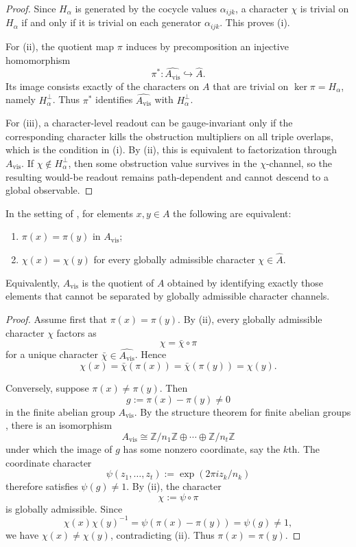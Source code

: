 \begin{proof}
Since $H_\alpha$ is generated by the cocycle values $\alpha_{ijk}$, a character $\chi$ is trivial on $H_\alpha$ if and only if it is trivial on each generator $\alpha_{ijk}$. This proves (i).

For (ii), the quotient map $\pi$ induces by precomposition an injective homomorphism
\[
\pi^*:\widehat{A_{\mathrm{vis}}}\hookrightarrow \widehat A.
\]
Its image consists exactly of the characters on $A$ that are trivial on $\ker\pi=H_\alpha$, namely $H_\alpha^\perp$. Thus $\pi^*$ identifies $\widehat{A_{\mathrm{vis}}}$ with $H_\alpha^\perp$.

For (iii), a character-level readout can be gauge-invariant only if the corresponding character kills the obstruction multipliers on all triple overlaps, which is the condition in (i). By (ii), this is equivalent to factorization through $A_{\mathrm{vis}}$. If $\chi\notin H_\alpha^\perp$, then some obstruction value survives in the $\chi$-channel, so the resulting would-be readout remains path-dependent and cannot descend to a global observable.
\end{proof}

\begin{corollary}\label{cor:visible-quotient-character-separation}
In the setting of , for elements $x,y\in A$ the following are equivalent:
\begin{enumerate}[label=(\roman*),nosep]
\item $\pi(x)=\pi(y)$ in $A_{\mathrm{vis}}$;
\item $\chi(x)=\chi(y)$ for every globally admissible character $\chi\in\widehat A$.
\end{enumerate}
Equivalently, $A_{\mathrm{vis}}$ is the quotient of $A$ obtained by identifying exactly those elements that cannot be separated by globally admissible character channels.
\end{corollary}

\begin{proof}
Assume first that $\pi(x)=\pi(y)$. By (ii), every globally admissible character $\chi$ factors as
\[
\chi=\bar\chi\circ\pi
\]
for a unique character $\bar\chi\in\widehat{A_{\mathrm{vis}}}$. Hence
\[
\chi(x)=\bar\chi(\pi(x))=\bar\chi(\pi(y))=\chi(y).
\]

Conversely, suppose $\pi(x)\neq\pi(y)$. Then
\[
g:=\pi(x)-\pi(y)\neq 0
\]
in the finite abelian group $A_{\mathrm{vis}}$. By the structure theorem for finite abelian groups \cite{DummitFoote2004}, there is an isomorphism
\[
A_{\mathrm{vis}}\cong \mathbb Z/n_1\mathbb Z\oplus\cdots\oplus \mathbb Z/n_t\mathbb Z
\]
under which the image of $g$ has some nonzero coordinate, say the $k$th. The coordinate character
\[
\psi(z_1,\dots,z_t):=\exp(2\pi i z_k/n_k)
\]
therefore satisfies $\psi(g)\neq 1$. By (ii), the character
\[
\chi:=\psi\circ\pi
\]
is globally admissible. Since
\[
\chi(x)\chi(y)^{-1}=\psi(\pi(x)-\pi(y))=\psi(g)\neq 1,
\]
we have $\chi(x)\neq\chi(y)$, contradicting (ii). Thus $\pi(x)=\pi(y)$.
\end{proof}

